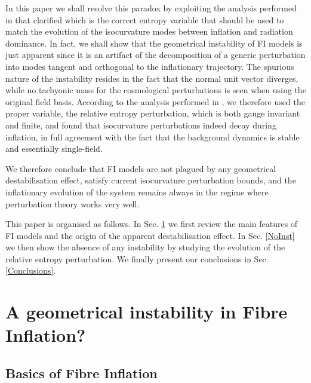 \documentclass[aps,prd,a4paper,twocolumn,amsmath,showpacs,superscriptaddress,nofootinbib,preprintnumbers]{revtex4-1}
\begin{document}
In this paper we shall resolve this paradox by exploiting the analysis performed in \cite{Cicoli:2021yhb} that clarified which is the correct entropy variable that should be used to match the evolution of the isocurvature modes between inflation and radiation dominance. In fact, we shall show that the geometrical instability of FI models is just apparent since it is an artifact of the decomposition of a generic perturbation into modes tangent and orthogonal to the inflationary trajectory. The spurious nature of the instability resides in the fact that the normal unit vector diverges, while no tachyonic mass for the cosmological perturbations is seen when using the original field basis. According to the analysis performed in \cite{Cicoli:2021yhb}, we therefore used the proper variable, the relative entropy perturbation, which is both gauge invariant and finite, and found that isocurvature perturbations indeed decay during inflation, in full agreement with the fact that the background dynamics is stable and essentially single-field.

We therefore conclude that FI models are not plagued by any geometrical destabilisation effect, satisfy current isocurvature perturbation bounds, and the inflationary evolution of the system remains always in the regime where perturbation theory works very well. 

This paper is organised as follows. In Sec. \ref{FibreReview} we first review the main features of FI models and the origin of the apparent destabilisation effect. In Sec. \ref{NoInst} we then show the absence of any instability by studying the evolution of the relative entropy perturbation. We finally present our conclusions in Sec. \ref{Conclusions}.



\section{A geometrical instability in Fibre Inflation?}
\label{FibreReview}

\subsection{Basics of Fibre Inflation}
\end{document}
